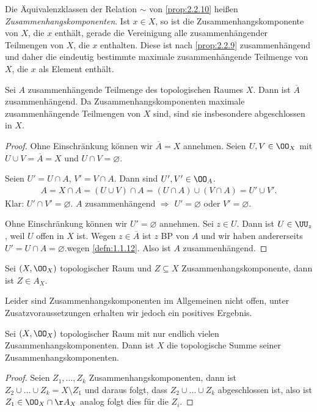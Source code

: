 \begin{defn}
\label{defn:2.2.11}
Die Äquivalenzklassen der Relation $\sim$ von \ref{prop:2.2.10} heißen
\emph{Zusammenhangskomponenten}. Ist $x\in X$, so ist die
Zusammenhangskomponente von $X$, die $x$ enthält, gerade die Vereinigung alle
zusammenhängender Teilmengen von $X$, die $x$ enthalten. Diese ist nach
\ref{prop:2.2.9} zusammenhängend und daher die eindeutig bestimmte maximale
zusammenhängende Teilmenge von $X$, die $x$ als Element enthält.\fishhere
\end{defn}

\begin{prop}
\label{prop:2.2.12}
Sei $A$ zusammenhängende Teilmenge des topologischen Raumes $X$. Dann ist
$\overline{A}$ zusammenhängend. Da Zusammenhangskomponenten maximale
zusammenhängende Teilmengen von $X$ sind, sind sie insbesondere abgeschlossen
in $X$.
\end{prop}
\begin{proof}
Ohne Einschränkung können wir $\overline{A}=X$ annehmen. Seien $U,V\in\OO_X$
mit $U\cup V= \overline{A} = X$ und $U\cap V = \varnothing$.

Seien $U' = U\cap A$, $V' = V\cap A$. Dann sind $U', V'\in\OO_A$.
\begin{align*}
A = X\cap A = (U\cup V)\cap A = (U\cap A)\cup(V\cap A) = U'\cup V'.
\end{align*}
Klar: $U'\cap V' = \varnothing$.
$A$ zusammenhängend $\Rightarrow$ $U' = \varnothing$ oder $V'=\varnothing$.

Ohne Einschränkung können wir $U' = \varnothing$ annehmen. Sei $z\in U$. Dann
ist $U\in\UU_z$, weil $U$ offen in $X$ ist. Wegen $z\in\overline{A}$ ist $z$ BP
von $A$ und wir haben andererseits $U' = U\cap A=\varnothing$.\dipper wegen
\ref{defn:1.1.12}. Also ist $A$ zusammenhängend.\qedhere
\end{proof}
\begin{cor}
\label{prop:2.2.13}
Sei $(X,\OO_X)$ topologischer Raum und $Z\subseteq X$ Zusammenhangskomponente,
dann ist $Z\in A_X$.\fishhere
\end{cor}

Leider sind Zusammenhangskomponenten im Allgemeinen nicht offen, unter
Zusatzvoraussetzungen erhalten wir jedoch ein positives Ergebnis.

\begin{cor}
\label{prop:2.2.14}
Sei $(X,\OO_X)$ topologischer Raum mit nur endlich vielen
Zusammenhangskomponenten. Dann ist $X$ die topologische Summe seiner
Zusammenhangskomponenten.\fishhere
\end{cor}
\begin{proof}
Seien $Z_1,\ldots,Z_k$ Zusammenhangskomponenten, dann ist $Z_2\cup\ldots\cup
Z_k = X\setminus Z_1$ und daraus folgt, dass $Z_2\cup\ldots\cup
Z_k$ abgeschlossen ist, also ist $Z_1\in\OO_X\cap\AA_X$ analog folgt dies für
die $Z_i$.\qedhere
\end{proof}

